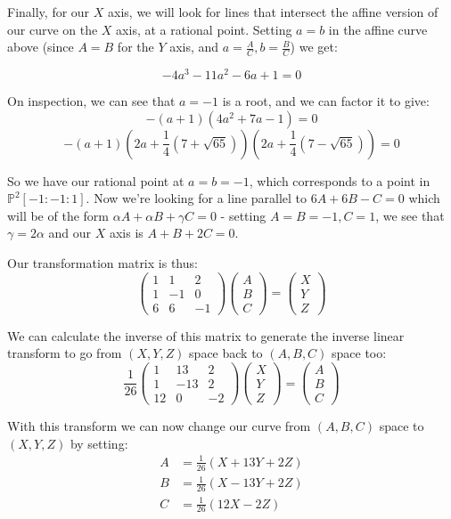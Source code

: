 \documentclass{article}
\begin{document}
Finally, for our $X$ axis, we will look for lines that intersect the affine version of our curve on the $X$ axis,
at a rational point. Setting $a=b$ in the affine curve above (since $A=B$ for the $Y$ axis, and
$a=\frac{A}{C}, b=\frac{B}{C}$) we get: 

\[ -4 a^3 -11a^2 -6a +1 = 0 \]

On inspection, we can see that $a=-1$ is a root, and we can factor it to give:
\[ -(a+1)(4a^2+7a-1) = 0 \]
\[ -(a + 1)(2a + \frac{1}{4}(7 + \sqrt{65}))(2a + \frac{1}{4}(7 - \sqrt{65})) = 0 \]

So we have our rational point at $a = b = -1$, which corresponds to a point in $\mathbb{P}^2 [-1:-1:1]$. Now we're
looking for a line parallel to $6A + 6B - C = 0$ which will be of the form $\alpha A + \alpha B + \gamma C = 0$ - 
setting $A=B=-1, C=1$, we see that $\gamma =2 \alpha$ and our $X$ axis is $ A + B + 2C = 0$.

Our transformation matrix is thus:
\[ 
\begin{pmatrix}
	1 & 1 & 2 \\
	1 & -1 & 0 \\
	6 & 6 & -1
\end{pmatrix}
\begin{pmatrix}
	A \\ B \\ C
\end{pmatrix}
 = 
\begin{pmatrix}
        X \\ Y \\ Z
\end{pmatrix}
\]

We can calculate the inverse of this matrix to generate the inverse linear transform to go from $(X,Y,Z)$ space
back to $(A,B,C)$ space too:
\[
	\frac{1}{26}
\begin{pmatrix}
        1 & 13 & 2 \\
        1 & -13 & 2 \\
        12 & 0 & -2
\end{pmatrix}
\begin{pmatrix}
        X \\ Y \\ Z
\end{pmatrix}
 =
\begin{pmatrix}
        A \\ B \\ C
\end{pmatrix}
\]

With this transform we can now change our curve from $(A,B,C)$ space to $(X, Y, Z)$ by setting:
\begin{equation*}
	\begin{split}
		A &= \frac{1}{26}\left(X + 13Y + 2Z\right) \\
		B &= \frac{1}{26}\left(X - 13Y + 2Z\right) \\
		C &= \frac{1}{26}\left(12X  - 2Z\right) \\
	\end{split}
\end{equation*}
\end{document}

